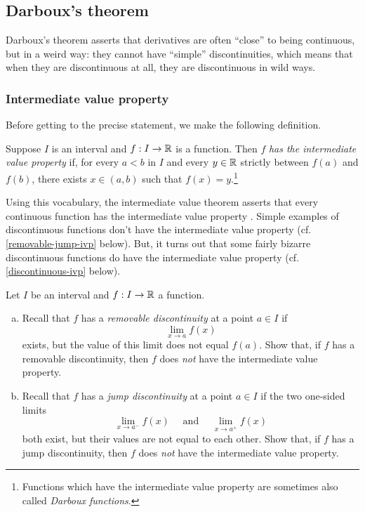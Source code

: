 \subsection{Darboux's theorem \starred} \label{darboux-section}

Darboux's theorem asserts that derivatives are often ``close'' to being continuous, but in a weird way: they cannot have ``simple'' discontinuities, which means that when they are discontinuous at all, they are discontinuous in wild ways. 

\subsubsection*{Intermediate value property}

Before getting to the precise statement, we make the following definition. 

\begin{definition} 
	Suppose $I$ is an interval and $f : I \to \mathbb{R}$ is a function. Then $f$ \emph{has the intermediate value property} if, for every $a < b$ in $I$ and every $y \in \mathbb{R}$ strictly between $f(a)$ and $f(b)$, there exists $x \in (a, b)$ such that $f(x) = y$.\footnote{Functions which have the intermediate value property are sometimes also called \emph{Darboux functions}.} 
\end{definition}

Using this vocabulary, the intermediate value theorem asserts that every continuous function has the intermediate value property \cite[theorem 3.3]{protter-morrey}. Simple examples of discontinuous functions don't have the intermediate value property (cf. \cref{removable-jump-ivp} below). But, it turns out that some fairly bizarre discontinuous functions do have the intermediate value property (cf. \cref{discontinuous-ivp} below). 

\begin{exercise} \label{removable-jump-ivp}
	Let $I$ be an interval and $f : I \to \mathbb{R}$ a function. 
	\begin{enumerate}[(a)]
		\item Recall that $f$ has a \emph{removable discontinuity} at a point $a \in I$ if
		\[ \lim_{x \to a} f(x) \]
		exists, but the value of this limit does not equal $f(a)$. Show that, if $f$ has a removable discontinuity, then $f$ does \emph{not} have the intermediate value property. 
		
		\item Recall that $f$ has a \emph{jump discontinuity} at a point $a \in I$ if the two one-sided limits
		\[ \lim_{x \to a^-} f(x) \quad\text{ and }\quad \lim_{x \to a^+} f(x) \]
		both exist, but their values are not equal to each other. Show that, if $f$ has a jump discontinuity, then $f$ does \emph{not} have the intermediate value property.  
	\end{enumerate}
\end{exercise}

